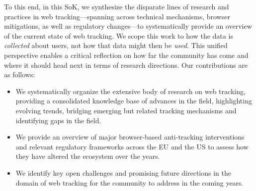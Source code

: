 To this end, in this SoK, we synthesize the disparate lines of research and practices in web tracking---spanning across technical mechanisms, browser mitigations, as well as regulatory changes---to systematically provide an overview of the current state of web tracking. 
%
We scope this work to how the data is \textit{collected} about users, not how that data might then be \textit{used}. 
%
This unified perspective enables a critical reflection on how far the community has come and where it should head next in terms of research directions.
%
Our contributions are as follows:
\vspace{-1mm}

\begin{itemize}
    \item We systematically organize the extensive body of research on web tracking, providing a consolidated knowledge base of advances in the field, highlighting evolving trends, bridging emerging but related tracking mechanisms and identifying gaps in the field.

    \item We provide an overview of major browser-based anti-tracking interventions and relevant regulatory frameworks across the EU and the US to assess how they have altered the ecosystem over the years.

    \item We identify key open challenges and promising future directions in the domain of web tracking for the community to address in the coming years.
\end{itemize}